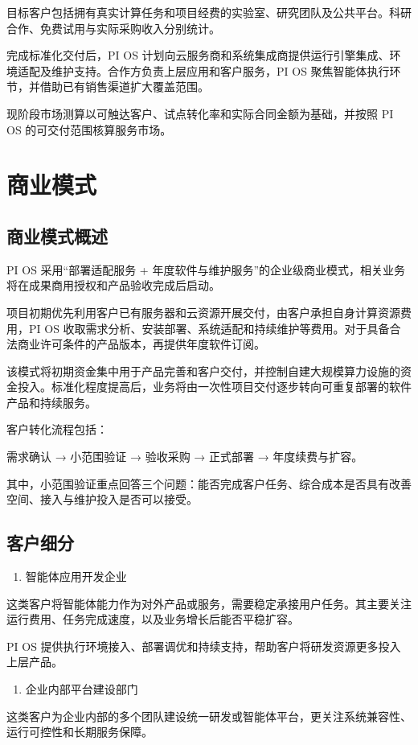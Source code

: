 目标客户包括拥有真实计算任务和项目经费的实验室、研究团队及公共平台。科研合作、免费试用与实际采购收入分别统计。

完成标准化交付后，PI OS 计划向云服务商和系统集成商提供运行引擎集成、环境适配及维护支持。合作方负责上层应用和客户服务，PI OS 聚焦智能体执行环节，并借助已有销售渠道扩大覆盖范围。

现阶段市场测算以可触达客户、试点转化率和实际合同金额为基础，并按照 PI OS 的可交付范围核算服务市场。

\section{商业模式}\label{sec:4.4}
\subsection{商业模式概述}\label{sec:4.4.1}
PI OS 采用“部署适配服务 + 年度软件与维护服务”的企业级商业模式，相关业务将在成果商用授权和产品验收完成后启动。

项目初期优先利用客户已有服务器和云资源开展交付，由客户承担自身计算资源费用，PI OS 收取需求分析、安装部署、系统适配和持续维护等费用。对于具备合法商业许可条件的产品版本，再提供年度软件订阅。

该模式将初期资金集中用于产品完善和客户交付，并控制自建大规模算力设施的资金投入。标准化程度提高后，业务将由一次性项目交付逐步转向可重复部署的软件产品和持续服务。

客户转化流程包括：

需求确认 → 小范围验证 → 验收采购 → 正式部署 → 年度续费与扩容。

其中，小范围验证重点回答三个问题：能否完成客户任务、综合成本是否具有改善空间、接入与维护投入是否可以接受。

\subsection{客户细分}\label{sec:4.4.2}
\begin{enumerate}
\item 智能体应用开发企业
\end{enumerate}
这类客户将智能体能力作为对外产品或服务，需要稳定承接用户任务。其主要关注运行费用、任务完成速度，以及业务增长后能否平稳扩容。

PI OS 提供执行环境接入、部署调优和持续支持，帮助客户将研发资源更多投入上层产品。

\begin{enumerate}
\item 企业内部平台建设部门
\end{enumerate}
这类客户为企业内部的多个团队建设统一研发或智能体平台，更关注系统兼容性、运行可控性和长期服务保障。

